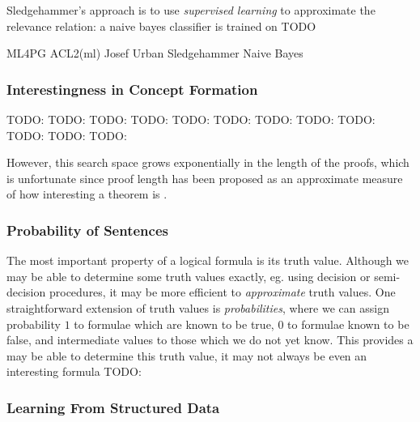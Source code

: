 \documentclass[]{article}
\begin{document}
Sledgehammer's approach is to use \emph{supervised learning} to approximate the relevance relation: a naive bayes classifier is trained on TODO

ML4PG
ACL2(ml)
Josef Urban
Sledgehammer
Naive Bayes

\subsubsection{Interestingness in Concept Formation}
\label{conceptformation}

TODO: \cite{Montano-Rivas.McCasland.Dixon.ea:2012}
TODO: \cite{Piantadosi.Tenenbaum.Goodman:2012}
TODO: \cite{Wille:2005}
TODO: \cite{colton1999automatic}
TODO: \cite{colton2000agent}
TODO: \cite{colton2012automated}
TODO: \cite{lenat1977automated}
TODO: \cite{mullerunderstanding}
TODO: \cite{zzzzz57269a963d945d8964c69b117f24e24c}
TODO: \cite{Bundy.Cavallo.Dixon.ea:2015}
TODO: \cite{johansson2009isacosy}
TODO: \cite{spector2008genetic}

However, this search space grows exponentially in the length of the proofs, which is unfortunate since proof length has been proposed as an approximate measure of how interesting a theorem is \cite[\S~10.2.1]{colton2012automated}.




\subsubsection{Probability of Sentences}

The most important property of a logical formula is its truth value. Although we may be able to determine some truth values exactly, eg. using decision or semi-decision procedures, it may be more efficient to \emph{approximate} truth values. One straightforward extension of truth values is \emph{probabilities}, where we can assign probability $1$ to formulae which are known to be true, $0$ to formulae known to be false, and intermediate values to those which we do not yet know. This provides a   may be able to determine this truth value, it may not always be even an interesting formula
TODO: \cite{Hutter.Lloyd.Ng.ea:2013}

\subsubsection{Learning From Structured Data}
\end{document}

